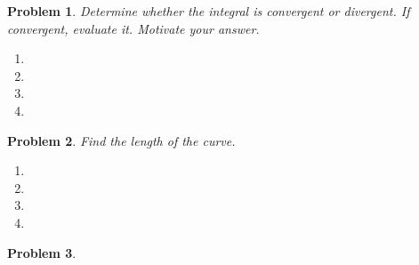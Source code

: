 \documentclass{article}
\renewcommand{\fcProblemRef}{\theproblem.\theenumi}
\newtheorem{problem}{Problem}
\begin{document}
\begin{problem} Determine whether the integral is convergent or divergent. If convergent, evaluate it. Motivate your answer.

\begin{multicols}{2}
\begin{enumerate}[ref={\fcProblemRef}]
\item 
\item 
\item 
\item 
\end{enumerate}
\end{multicols}
\end{problem}

\begin{problem}Find the length of the curve.
\begin{enumerate}[ref={\fcProblemRef}]
\item 
\item 
\item 
\item 
\end{enumerate}
\end{problem}




\begin{problem}


\end{problem}




%
%
\end{document}
